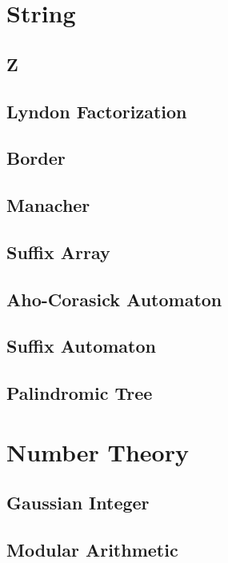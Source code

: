 \documentclass{article}
\begin{document}
\begin{multicols}{2}
    \section{String}
    \subsection{Z}
    
    \subsection{Lyndon Factorization}
    
    \subsection{Border}
    
    \subsection{Manacher}
    
    \subsection{Suffix Array}
    
    \subsection{Aho-Corasick Automaton}
    
    \subsection{Suffix Automaton}
    
    \subsection{Palindromic Tree}
    

    \section{Number Theory}
    \subsection{Gaussian Integer}
    
    \subsection{Modular Arithmetic}

\end{multicols}
\end{document}
